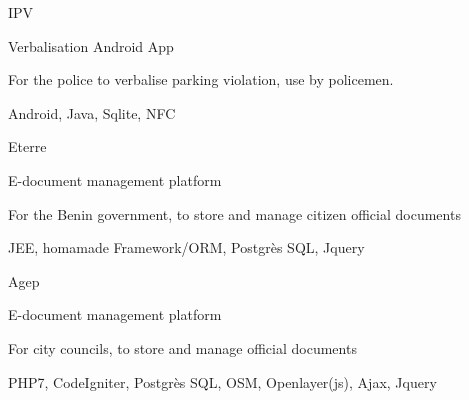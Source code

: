 \begin{cventries}
    {IPV} %
    {} %
    {
      \begin{cvitems} %
        \item {Verbalisation Android App}
        \item{For the police to verbalise parking violation,  use by policemen. }
        \item{Android, Java, Sqlite, NFC}
      \end{cvitems}
    }
  
    {Eterre} %
    {} %
    {} %
    {
      \begin{cvitems} %
        \item {E-document management platform}
        \item{For the Benin government,  to store and manage citizen official documents}
        \item{JEE, homamade Framework/ORM, Postgrès SQL, Jquery}
      \end{cvitems}
    }
  
    {Agep} %
    {} %
    {} %
    {
      \begin{cvitems} %
        \item {E-document management platform}
        \item{For city councils, to store and manage official documents}
        \item{PHP7, CodeIgniter, Postgrès SQL, OSM, Openlayer(js), Ajax, Jquery}        
      \end{cvitems}
    }

\end{cventries}


